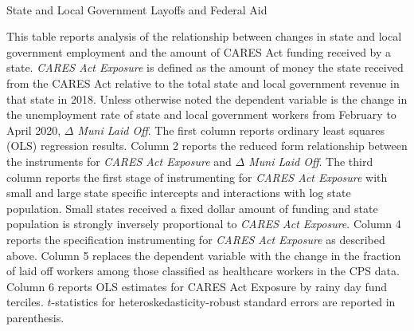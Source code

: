 \begin{singlespace}

\begin{table}
\begin{center}
\begin{threeparttable}
\caption{\\ State and Local Government Layoffs and Federal Aid}
\label{table:layoffCARES}

\centering 

\begin{small}

	

\end{small}

\begin{footnotesize}
\begin{tablenotes}
\item This table reports analysis of the relationship between changes in state and local government employment and the amount of CARES Act funding received by a state. \emph{CARES Act Exposure} is defined as the amount of money the state received from the CARES Act relative to the total state and local government revenue in that state in 2018. Unless otherwise noted the dependent variable is the change in the unemployment rate of state and local government workers from February to April 2020, \emph{$\Delta$ Muni Laid Off}. The first column reports ordinary least squares (OLS) regression results. Column 2 reports the reduced form relationship between the instruments for \emph{CARES Act Exposure} and \emph{$\Delta$ Muni Laid Off}. The third column reports the first stage of instrumenting for \emph{CARES Act Exposure} with small and large state specific intercepts and interactions with log state population. Small states received a fixed dollar amount of funding and state population is strongly inversely proportional to \emph{CARES Act Exposure}. Column 4 reports the specification instrumenting for \emph{CARES Act Exposure} as described above. Column 5 replaces the dependent variable with the change in the fraction of laid off workers among those classified as healthcare workers in the CPS data. Column 6 reports OLS estimates for CARES Act Exposure by rainy day fund terciles. $t$-statistics for heteroskedasticity-robust standard errors are reported in parenthesis. 
\end{tablenotes}
\end{footnotesize}
\end{threeparttable}
\end{center}
\end{table}

\end{singlespace}
\thispagestyle{empty}

